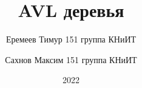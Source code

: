 \documentclass[aspectratio=169]{beamer}
\title{AVL деревья}
\institute[СГУ им. Чернышевского]{Саратовский Государственный Университет им. Чернышевского}
\author{Еремеев Тимур 151 группа КНиИТ}
\author{Сахнов Максим 151 группа КНиИТ}
\date{2022}
\begin{document}
    \frame{\titlepage}
    

    
   
    

    
\end{document}
